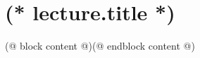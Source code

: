 \documentclass[12pt, twoside]{dgs}
\numberwithin{equation}{subsection}
\numberwithin{figure}{subsection}
\begin{document}
    \pagestyle{scholar}
    \chapter{(* lecture.title *)}
    
    (@ block content @)(@ endblock content @)
\end{document}

